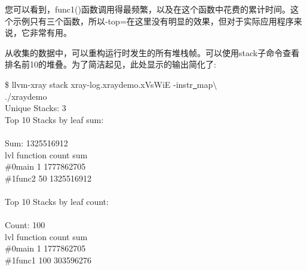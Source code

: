 您可以看到，func1()函数调用得最频繁，以及在这个函数中花费的累计时间。这个示例只有三个函数，所以-top=在这里没有明显的效果，但对于实际应用程序来说，它非常有用。\par

从收集的数据中，可以重构运行时发生的所有堆栈帧。可以使用stack子命令查看排名前10的堆叠。为了简洁起见，此处显示的输出简化了:\par

\begin{tcolorbox}[colback=white,colframe=black]
\$ llvm-xray stack xray-log.xraydemo.xVsWiE -instr\underline{~}map$\setminus$ \\
\hspace*{0.5cm}./xraydemo \\
Unique Stacks: 3 \\
Top 10 Stacks by leaf sum:\\
\\
Sum: 1325516912\\
lvl \hspace{1cm}function \hspace{2.5cm}count \hspace{2.5cm}sum\\
\#0\hspace{1.5cm}main \hspace{3.3cm}1 \hspace{1.3cm}1777862705 \\
\#1\hspace{1.5cm}func2 \hspace{3.0cm}50 \hspace{1.35cm}1325516912 \\
\\
Top 10 Stacks by leaf count:\\
\\
Count: 100 \\
lvl \hspace{1cm}function \hspace{2.5cm}count \hspace{2.5cm}sum \\
\#0\hspace{1.5cm}main \hspace{3.3cm}1 \hspace{1.3cm}1777862705 \\
\#1\hspace{1.5cm}func1 \hspace{2.9cm}100 \hspace{1.45cm}303596276
\end{tcolorbox}


